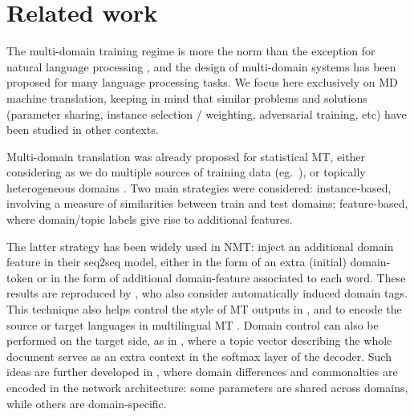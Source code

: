 \documentclass[11pt,a4paper]{article}
\newcommand{\fyDone}[1]{\done[FY]\Todo[FY:]{\textcolor{orange}{#1}}}
\begin{document}
\section{Related work \label{sec:related}}

The multi-domain training regime is more the norm than the exception for natural language processing \cite{Dredze08online,Finkel09hierarchical}, and the design of multi-domain systems has been proposed for many language processing tasks. We focus here exclusively on MD machine translation, keeping in mind that similar problems and solutions (parameter sharing, instance selection / weighting, adversarial training, etc) have been studied in other contexts.


Multi-domain translation was already proposed for statistical MT, either considering as we do multiple sources of training data (eg.\ \cite{Banerjee10combining,Clark12onesystem,Sennrich13multidomain,Huck15mixeddomain}), or topically heterogeneous domains \cite{Eidelman12topic,Hasler14dynamic-topic}.\fyDone{Add also topic models refs} Two main strategies were considered: instance-based, involving a measure of similarities between train and test domains; feature-based, where domain/topic labels give rise to additional features. 

The latter strategy has been widely used in NMT:  inject an additional domain feature in their seq2seq model, either in the form of an extra (initial) domain-token or in the form of additional domain-feature associated to each word. These results are reproduced by , who also consider automatically induced domain tags. This technique also helps control the style of MT outputs in \cite{Sennrich16politeness,Niu18multitask}, and to encode the source or target languages in multilingual MT \cite{Firat16multiway,Johnson17google}. Domain control can also be performed on the target side, as in \cite{Chen16guided}, where a topic vector describing the whole document serves as an extra context in the softmax layer of the decoder. Such ideas are further developed in \cite{Chu18multilingual,Pham19generic}, where domain differences and commonalties are encoded in the network architecture: some parameters are shared across domains, while others are domain-specific. %
\end{document}
